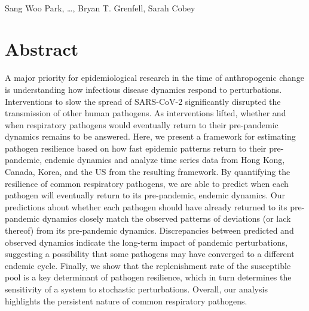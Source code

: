 \documentclass[12pt]{article}
\date{\today}
\begin{document}
\begin{flushleft}{
	\Large
	\textbf{}
}
\newline
\\
Sang Woo Park, \dots, Bryan T. Grenfell, Sarah Cobey
\\
\bigskip
\end{flushleft}

\section*{Abstract}

A major priority for epidemiological research in the time of anthropogenic change is understanding how infectious disease dynamics respond to perturbations.
Interventions to slow the spread of SARS-CoV-2 significantly disrupted the transmission of other human pathogens. 
As interventions lifted, whether and when respiratory pathogens would eventually return to their pre-pandemic dynamics remains to be answered.
Here, we present a framework for estimating pathogen resilience based on how fast epidemic patterns return to their pre-pandemic, endemic dynamics and analyze time series data from Hong Kong, Canada, Korea, and the US from the resulting framework.
By quantifying the resilience of common respiratory pathogens, we are able to predict when each pathogen will eventually return to its pre-pandemic, endemic dynamics.
Our predictions about whether each pathogen should have already returned to its pre-pandemic dynamics closely match the observed patterns of deviations (or lack thereof) from its pre-pandemic dynamics.
Discrepancies between predicted and observed dynamics indicate the long-term impact of pandemic perturbations, suggesting a possibility that some pathogens may have converged to a different endemic cycle.
Finally, we show that the replenishment rate of the susceptible pool is a key determinant of pathogen resilience, which in turn determines the sensitivity of a system to stochastic perturbations.
Overall, our analysis highlights the persistent nature of common respiratory pathogens.

\pagebreak
\end{document}
